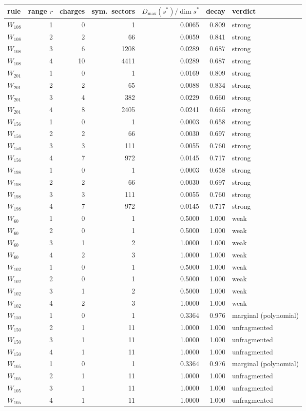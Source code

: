 \begin{tabular}{lrrrrrl}
\toprule
rule & range $r$ & charges & sym.\ sectors & $D_{\max}(s^*)/\dim s^*$ & decay & verdict \\
\midrule
$W_{108}$ & 1 & 0 & 1 & 0.0065 & 0.809 & strong \\
$W_{108}$ & 2 & 2 & 66 & 0.0059 & 0.841 & strong \\
$W_{108}$ & 3 & 6 & 1208 & 0.0289 & 0.687 & strong \\
$W_{108}$ & 4 & 10 & 4411 & 0.0289 & 0.687 & strong \\
$W_{201}$ & 1 & 0 & 1 & 0.0169 & 0.809 & strong \\
$W_{201}$ & 2 & 2 & 65 & 0.0088 & 0.834 & strong \\
$W_{201}$ & 3 & 4 & 382 & 0.0229 & 0.660 & strong \\
$W_{201}$ & 4 & 8 & 2405 & 0.0241 & 0.665 & strong \\
$W_{156}$ & 1 & 0 & 1 & 0.0003 & 0.658 & strong \\
$W_{156}$ & 2 & 2 & 66 & 0.0030 & 0.697 & strong \\
$W_{156}$ & 3 & 3 & 111 & 0.0055 & 0.760 & strong \\
$W_{156}$ & 4 & 7 & 972 & 0.0145 & 0.717 & strong \\
$W_{198}$ & 1 & 0 & 1 & 0.0003 & 0.658 & strong \\
$W_{198}$ & 2 & 2 & 66 & 0.0030 & 0.697 & strong \\
$W_{198}$ & 3 & 3 & 111 & 0.0055 & 0.760 & strong \\
$W_{198}$ & 4 & 7 & 972 & 0.0145 & 0.717 & strong \\
$W_{60}$ & 1 & 0 & 1 & 0.5000 & 1.000 & weak \\
$W_{60}$ & 2 & 0 & 1 & 0.5000 & 1.000 & weak \\
$W_{60}$ & 3 & 1 & 2 & 1.0000 & 1.000 & weak \\
$W_{60}$ & 4 & 2 & 3 & 1.0000 & 1.000 & weak \\
$W_{102}$ & 1 & 0 & 1 & 0.5000 & 1.000 & weak \\
$W_{102}$ & 2 & 0 & 1 & 0.5000 & 1.000 & weak \\
$W_{102}$ & 3 & 1 & 2 & 0.5000 & 1.000 & weak \\
$W_{102}$ & 4 & 2 & 3 & 1.0000 & 1.000 & weak \\
$W_{150}$ & 1 & 0 & 1 & 0.3364 & 0.976 & marginal (polynomial) \\
$W_{150}$ & 2 & 1 & 11 & 1.0000 & 1.000 & unfragmented \\
$W_{150}$ & 3 & 1 & 11 & 1.0000 & 1.000 & unfragmented \\
$W_{150}$ & 4 & 1 & 11 & 1.0000 & 1.000 & unfragmented \\
$W_{105}$ & 1 & 0 & 1 & 0.3364 & 0.976 & marginal (polynomial) \\
$W_{105}$ & 2 & 1 & 11 & 1.0000 & 1.000 & unfragmented \\
$W_{105}$ & 3 & 1 & 11 & 1.0000 & 1.000 & unfragmented \\
$W_{105}$ & 4 & 1 & 11 & 1.0000 & 1.000 & unfragmented \\
\bottomrule
\end{tabular}
